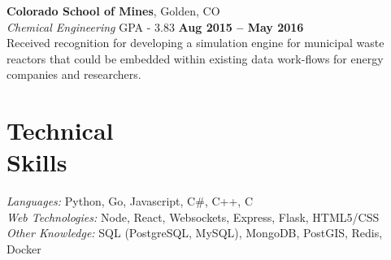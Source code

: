 \documentclass[margin,line]{resume}
\begin{document}
\begin{resume}
    \textbf{Colorado School of Mines}, Golden, CO \vspace{2mm}\\\vspace{1mm}%
    \textsl{Chemical Engineering} GPA - 3.83 \hfill \textbf{Aug 2015 -- May 2016}\\
    Received recognition for developing a simulation engine for municipal waste
    reactors that could be embedded within existing data work-flows for energy
    companies and researchers.

    \section{\mysidestyle Technical\\Skills}

    \emph{Languages:} Python, Go, Javascript, C\#, C++, C\\
    \emph{Web Technologies:} Node, React, Websockets, Express, Flask, HTML5/CSS\\
    \emph{Other Knowledge:} SQL (PostgreSQL, MySQL), MongoDB, PostGIS, Redis, Docker\\
\end{resume}
\end{document}
